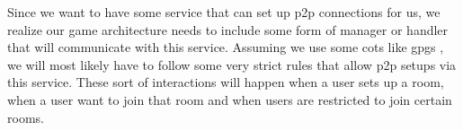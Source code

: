 Since we want to have some service that can set up \gls{p2p} connections for us, we realize our game architecture needs to include some form of manager or handler that will communicate with this service. Assuming we use some \gls{cots} like \gls{gpgs} \citep{gpgs}, we will most likely have to follow some very strict rules that allow \gls{p2p} setups via this service. These sort of interactions will happen when a user sets up a room, when a user want to join that room and when users are restricted to join certain rooms.

